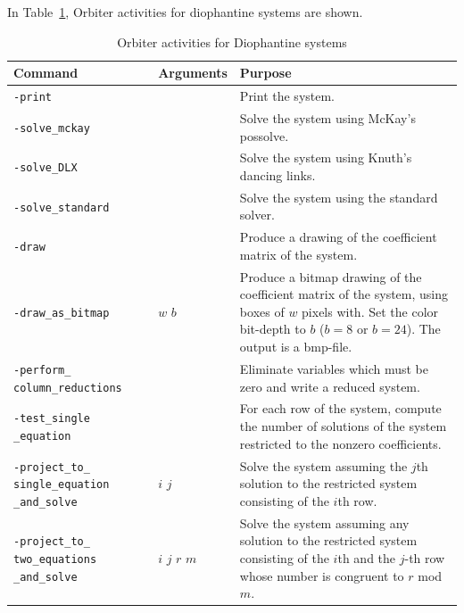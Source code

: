 In Table~\ref{tab:diophant:activities}, Orbiter activities for diophantine systems are shown.
\begin{table}
	\begin{center}
	\begin{tabular}{|p{4cm}|p{3cm}|p{7cm}|}
		\hline
		Command & Arguments & Purpose \\
		\hline
		\hline
		\verb'-print' &  & Print the system. \\
		\hline
		\verb'-solve_mckay' &  & Solve the system using McKay's possolve.\\
		\hline
		\verb'-solve_DLX' &  & Solve the system using Knuth's dancing links.\\
		\hline
		\verb'-solve_standard' &  & Solve the system using the standard solver.\\
		\hline
		\verb'-draw' &  & Produce a drawing of the coefficient matrix of the system.\\
		\hline
		\verb'-draw_as_bitmap' & $w$ $b$ & Produce a bitmap 
		drawing of the coefficient matrix of the system, 
		using boxes of $w$ pixels with. 
		Set the color bit-depth to $b$ ($b=8$ or $b=24$). The output is a bmp-file. \\
		\hline
		\verb'-perform_' \verb'column_reductions' &  & 
		Eliminate variables which must be zero and write a reduced system.\\
		\hline
		\verb'-test_single' \verb'_equation' &  & For each row of the system, 
		compute the number of solutions of the system restricted to the nonzero coefficients. \\
		\hline
		\verb'-project_to_' \verb'single_equation' \verb'_and_solve' & $i$ $j$ & 
		Solve the system assuming the $j$th solution to the 
		restricted system consisting of the $i$th row. \\
		\hline
		\verb'-project_to_' \verb'two_equations' \verb'_and_solve' & $i$ $j$ $r$ $m$ & 
		Solve the system assuming any solution to the restricted system consisting of the $i$th 
		and the $j$-th row  whose number is congruent to $r$ mod $m$. \\
		\hline
		\end{tabular}
	\end{center}
	\caption{\label{tab:diophant:activities}Orbiter activities for Diophantine systems}
	\end{table}


